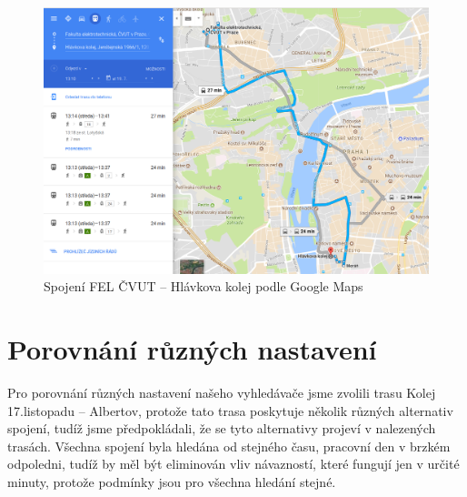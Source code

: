 \begin{figure}[h]
  \centering
    \includegraphics[width=\textwidth]{../img/fel-hlavkova-google.png}
  \caption{Spojení FEL ČVUT -- Hlávkova kolej podle Google Maps}
  \label{fig:fel-hlavkova-google}
\end{figure}

\clearpage
\section{Porovnání různých nastavení}
Pro porovnání různých nastavení našeho vyhledávače jsme zvolili trasu Kolej
17.listopadu -- Albertov, protože tato trasa poskytuje několik různých
alternativ spojení, tudíž jsme předpokládali, že se tyto alternativy projeví v
nalezených trasách. Všechna spojení byla hledána od stejného času, pracovní den
v brzkém odpoledni, tudíž by měl být eliminován vliv návazností, které fungují
jen v určité minuty, protože podmínky jsou pro všechna hledání stejné.

